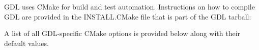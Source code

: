 GDL uses CMake for build and test automation. 
Instructions on how to compile GDL are provided in the 
  INSTALL.CMake file that is part of the GDL tarball:


A list of all GDL-specific CMake options is provided below
  along with their default values.

